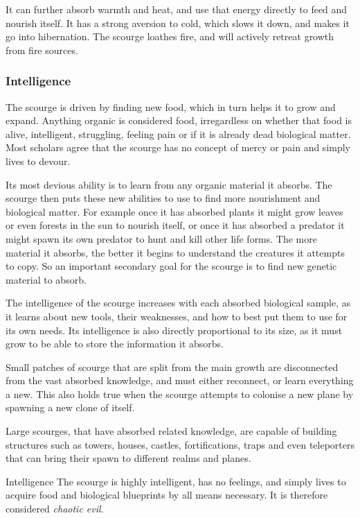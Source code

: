 It can further absorb warmth and heat, and use that energy directly to feed
and nourish itself. It has a strong aversion to cold, which slows it down,
and makes it go into hibernation. The scourge loathes fire, and will actively
retreat growth from fire sources.

\subsubsection{Intelligence}

The scourge is driven by finding new food, which in turn helps it to grow and
expand. Anything organic is considered food, irregardless on whether that food
is alive, intelligent, struggling, feeling pain or if it is already dead
biological matter. Most scholars agree that the scourge has no concept of
mercy or pain and simply lives to devour.

Its most devious ability is to learn from any organic material it absorbs. The
scourge then puts these new abilities to use to find more nourishment and
biological matter. For example once it has absorbed plants it might grow
leaves or even forests in the sun to nourish itself, or once it has absorbed a
predator it might spawn its own predator to hunt and kill other life
forms. The more material it absorbs, the better it begins to understand the
creatures it attempts to copy. So an important secondary goal for the scourge
is to find new genetic material to absorb.

The intelligence of the scourge increases with each absorbed biological
sample, as it learns about new tools, their weaknesses, and how to best put
them to use for its own needs. Its intelligence is also directly proportional
to its size, as it must grow to be able to store the information it absorbs.

Small patches of scourge that are split from the main growth are disconnected
from the vast absorbed knowledge, and must either reconnect, or learn
everything a new. This also holds true when the scourge attempts to colonise
a new plane by spawning a new clone of itself.

Large scourges, that have absorbed related knowledge, are capable of building
structures such as towers, houses, castles, fortifications, traps and even
teleporters that can bring their spawn to different realms and planes.

\begin{35e}{Intelligence}
  The scourge is highly intelligent, has no feelings, and simply lives to
  acquire food and biological blueprints by all means necessary. It is therefore
  considered \emph{chaotic evil}.
\end{35e}

